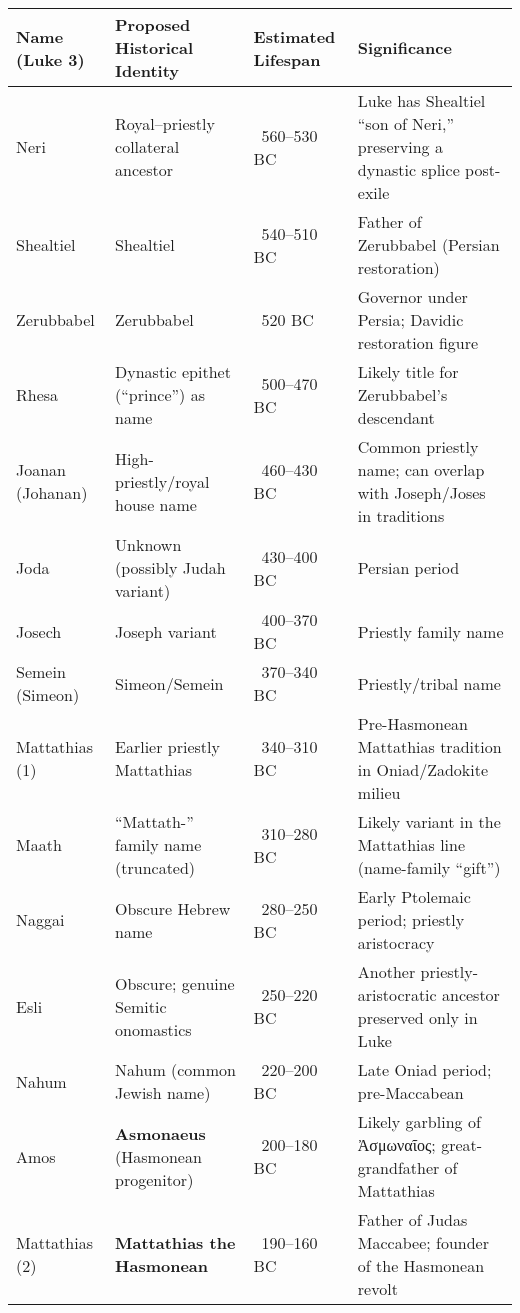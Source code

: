 \begin{table}[h]
    \centering
    \begin{tabular}{|l|p{3.4cm}|p{2.8cm}|p{6.6cm}|}
        \hline
        \textbf{Name (Luke 3)} & \textbf{Proposed Historical Identity} & \textbf{Estimated Lifespan} & \textbf{Significance} \\ \hline
        Neri & Royal–priestly collateral ancestor & ~560–530 BC & Luke has Shealtiel “son of Neri,” preserving a dynastic splice post-exile \\ \hline
        Shealtiel & Shealtiel & ~540–510 BC & Father of Zerubbabel (Persian restoration) \\ \hline
        Zerubbabel & Zerubbabel & ~520 BC & Governor under Persia; Davidic restoration figure \\ \hline
        Rhesa & Dynastic epithet (“prince”) as name & ~500–470 BC & Likely title for Zerubbabel’s descendant \\ \hline
        Joanan (Johanan) & High-priestly/royal house name & ~460–430 BC & Common priestly name; can overlap with Joseph/Joses in traditions \\ \hline
        Joda & Unknown (possibly Judah variant) & ~430–400 BC & Persian period \\ \hline
        Josech & Joseph variant & ~400–370 BC & Priestly family name \\ \hline
        Semein (Simeon) & Simeon/Semein & ~370–340 BC & Priestly/tribal name \\ \hline
        Mattathias (1) & Earlier priestly Mattathias & ~340–310 BC & Pre-Hasmonean Mattathias tradition in Oniad/Zadokite milieu \\ \hline
        Maath & “Mattath-” family name (truncated) & ~310–280 BC & Likely variant in the Mattathias line (name-family “gift”) \\ \hline
        Naggai & Obscure Hebrew name & ~280–250 BC & Early Ptolemaic period; priestly aristocracy \\ \hline
        Esli & Obscure; genuine Semitic onomastics & ~250–220 BC & Another priestly-aristocratic ancestor preserved only in Luke \\ \hline
        Nahum & Nahum (common Jewish name) & ~220–200 BC & Late Oniad period; pre-Maccabean \\ \hline
        Amos & \textbf{Asmonaeus} (Hasmonean progenitor) & ~200–180 BC & Likely garbling of Ἀσμωναῖος; great-grandfather of Mattathias \\ \hline
        Mattathias (2) & \textbf{Mattathias the Hasmonean} & ~190–160 BC & Father of Judas Maccabee; founder of the Hasmonean revolt \\ \hline

\end{tabular}
\end{table}
